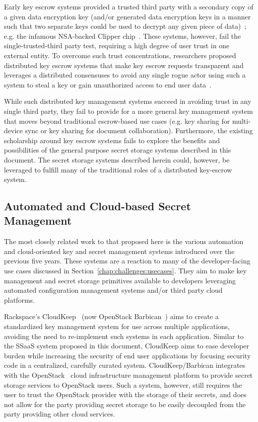 Early key escrow systems provided a trusted third party with a
secondary copy of a given data encryption key (and/or generated data
encryption keys in a manner such that two separate keys could be used
to decrypt any given piece of data)~\cite{denning1996}; e.g. the
infamous NSA-backed Clipper chip~\cite{whitehouse-clipper}. These
systems, however, fail the single-trusted-third party test, requiring
a high degree of user trust in one external entity. To overcome such
trust concentrations, researchers proposed distributed key escrow
systems that make key escrow requests transparent and leverages a
distributed consensuses to avoid any single rogue actor using such a
system to steal a key or gain unauthorized access to end user
data~\cite{blaze1996}.

While such distributed key management systems succeed in avoiding
trust in any single third party, they fail to provide for a more
general key management system that moves beyond traditional
escrow-based use cases (e.g. key sharing for multi-device sync or key
sharing for document collaboration). Furthermore, the existing
scholarship around key escrow systems fails to explore the benefits
and possibilities of the general purpose secret storage systems
described in this document. The secret storage systems described
herein could, however, be leveraged to fulfill many of the traditional
roles of a distributed key-escrow system.

\subsection{Automated and Cloud-based Secret Management}

The most closely related work to that proposed here is the various
automation and cloud-oriented key and secret management systems
introduced over the previous five years. These systems are a reaction
to many of the developer-facing use cases discussed in
Section~\ref{chap:challenges:usecases}. They aim to make key
management and secret storage primitives available to developers
leveraging automated configuration management systems and/or third
party cloud platforms.

Rackspace's CloudKeep~\cite{cloudkeep-presentation, cloudkeep} (now
OpenStack Barbican~\cite{openstack-barbican}) aims to create a
standardized key management system for use across multiple
applications, avoiding the need to re-implement such systems in each
application. Similar to the SSaaS system proposed in this document,
CloudKeep aims to ease developer burden while increasing the security
of end user applications by focusing security code in a centralized,
carefully curated system. CloudKeep/Barbican integrates with the
OpenStack~\cite{openstack} cloud infrastructure management platform to
provide secret storage services to OpenStack users. Such a system,
however, still requires the user to trust the OpenStack provider with
the storage of their secrets, and does not allow for the party
providing secret storage to be easily decoupled from the party
providing other cloud services.

